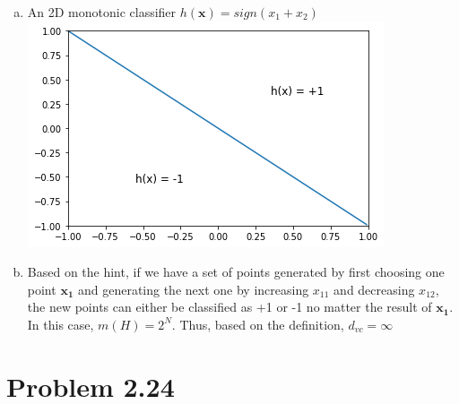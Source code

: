\documentclass{article}
\def\math#1{$#1$}
\begin{document}
\begin{enumerate}[a)]
    \item An 2D monotonic classifier \math{h(\mathbf{x}) = sign(x_1 + x_2)}\\
    \includegraphics{2.15/1}
    \item Based on the hint, if we have a set of points generated by first choosing one point \math{\mathbf{x_1}} and generating the next one by increasing \math{x_{11}} and decreasing \math{x_{12}}, the new points can either be classified as +1 or -1 no matter the result of \math{\mathbf{x_1}}. In this case, \math{m(H) = 2^N}. Thus, based on the definition, \math{d_{vc} = \infty}
\end{enumerate}

\section{Problem 2.24}
\end{document}
